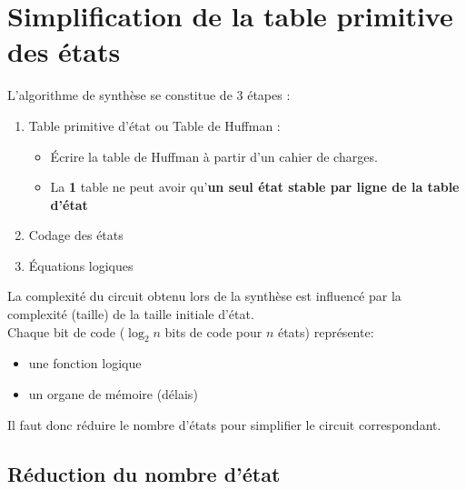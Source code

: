 \section{Simplification de la table primitive des états}
L’algorithme de synthèse se constitue de 3 étapes :
\begin{enumerate}
	\item Table primitive d'état ou Table de Huffman :
	\begin{itemize}
		\item Écrire la table de Huffman à partir d'un cahier de charges.
		\item La \textbf{1} table ne peut avoir qu'\textbf{un seul état stable par ligne de la table d'état}
	\end{itemize}
	\item Codage des états
	\item Équations logiques
\end{enumerate}
La complexité du circuit obtenu lors de la synthèse est influencé par la complexité (taille) de la taille initiale d'état.\\
Chaque bit de code ($\log_2n$ bits de code pour $n$ états) représente:
\begin{itemize}
	\item une fonction logique
	\item un organe de mémoire (délais)
\end{itemize}
Il faut donc réduire le nombre d'états pour simplifier le circuit correspondant.
\subsection{Réduction du nombre d'état}
